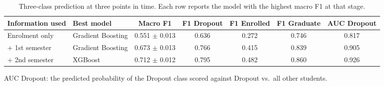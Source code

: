\begin{table}[H]
\centering
\small
\setlength{\tabcolsep}{4pt}
\footnotesize
\caption{Three-class prediction at three points in time. Each row reports the model with the highest macro F1 at that stage.}
\label{tab:stages}
\begin{tabular}{llccccc}
\toprule
Information used & Best model & Macro F1 & F1 Dropout & F1 Enrolled & F1 Graduate & AUC Dropout \\
\midrule
Enrolment only & Gradient Boosting & 0.551 $\pm$ 0.013 & 0.636 & 0.272 & 0.746 & 0.817 \\
+ 1st semester & Gradient Boosting & 0.673 $\pm$ 0.013 & 0.766 & 0.415 & 0.839 & 0.905 \\
+ 2nd semester & XGBoost & 0.712 $\pm$ 0.012 & 0.795 & 0.482 & 0.860 & 0.926 \\
\bottomrule
\end{tabular}
\par\smallskip\footnotesize AUC Dropout: the predicted probability of the Dropout class scored against Dropout vs.\ all other students.
\end{table}
